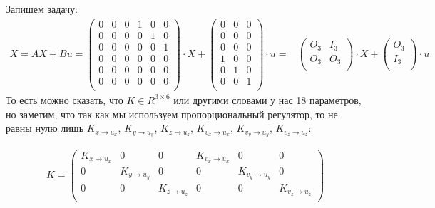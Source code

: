 \documentclass[a4paper,12pt]{article}
\numberwithin{figure}{subsubsection}
\begin{document}
Запишем задачу:
\begin{align*}
    \Dot{X} = AX + Bu =
            \begin{pmatrix}
                0& 0& 0& 1& 0& 0\\
                0& 0& 0& 0& 1& 0\\
                0& 0& 0& 0& 0& 1\\
                0& 0& 0& 0& 0& 0\\
                0& 0& 0& 0& 0& 0\\
                0& 0& 0& 0& 0& 0\\
            \end{pmatrix} 
            \cdot X +
            \begin{pmatrix}
                0& 0& 0\\
                0& 0& 0\\
                0& 0& 0\\
                1& 0& 0\\
                0& 1& 0\\
                0& 0& 1\\
            \end{pmatrix}
            \cdot u = 
            &\begin{pmatrix}
                O_3& I_3\\
                O_3& O_3\\ 
            \end{pmatrix}
            \cdot X +
            \begin{pmatrix}
                O_3\\
                I_3\\
            \end{pmatrix}
            \cdot u
\end{align*}
То есть можно сказать, что $K\in R^{3\times 6}$ или другими словами у нас 18 параметров, но заметим, что так как мы используем пропорциональный регулятор, то не равны нулю лишь $K_{x\rightarrow u_x}$, $K_{y\rightarrow u_y}$, $K_{z\rightarrow u_z}$, $K_{v_x\rightarrow u_x}$, $K_{v_y\rightarrow u_y}$, $K_{v_z\rightarrow u_z}$:

\begin{align*}
K =
\begin{pmatrix}
    K_{x\rightarrow u_x}& 0& 0& K_{v_x\rightarrow u_x} & 0& 0\\
    0& K_{y\rightarrow u_y} & 0& 0& K_{v_y\rightarrow u_y} & 0\\
    0& 0& K_{z\rightarrow u_z} & 0& 0& K_{v_z\rightarrow u_z} \\
\end{pmatrix}
\end{align*}
\end{document}
